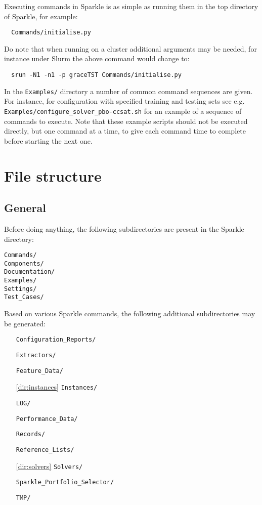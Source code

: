 \documentclass{article}
\begin{document}
Executing commands in Sparkle is as simple as running them in the top directory of Sparkle, for example:

\begin{verbatim}
  Commands/initialise.py
\end{verbatim}

Do note that when running on a cluster additional arguments may be needed, for instance under Slurm the above command would change to:

\begin{verbatim}
  srun -N1 -n1 -p graceTST Commands/initialise.py
\end{verbatim}

In the \texttt{Examples/} directory a number of common command sequences are given. For instance, for configuration with specified training and testing sets see e.g. \texttt{Examples/configure\_solver\_pbo-ccsat.sh} for an example of a sequence of commands to execute. Note that these example scripts should not be executed directly, but one command at a time, to give each command time to complete before starting the next one.

\section{File structure}

\subsection{General}
Before doing anything, the following subdirectories are present in the Sparkle directory:

\begin{verbatim}
Commands/
Components/
Documentation/
Examples/
Settings/
Test_Cases/
\end{verbatim}

Based on various Sparkle commands, the following additional subdirectories may be generated:

\begin{itemize}[noitemsep]
  \item[] \texttt{Configuration\_Reports/}
  \item[] \texttt{Extractors/}
  \item[] \texttt{Feature\_Data/}
  \item[\ref{dir:instances}] \texttt{Instances/}
  \item[] \texttt{LOG/}
  \item[] \texttt{Performance\_Data/}
  \item[] \texttt{Records/}
  \item[] \texttt{Reference\_Lists/}
  \item[\ref{dir:solvers}] \texttt{Solvers/}
  \item[] \texttt{Sparkle\_Portfolio\_Selector/}
  \item[] \texttt{TMP/}
\end{itemize}
\end{document}
